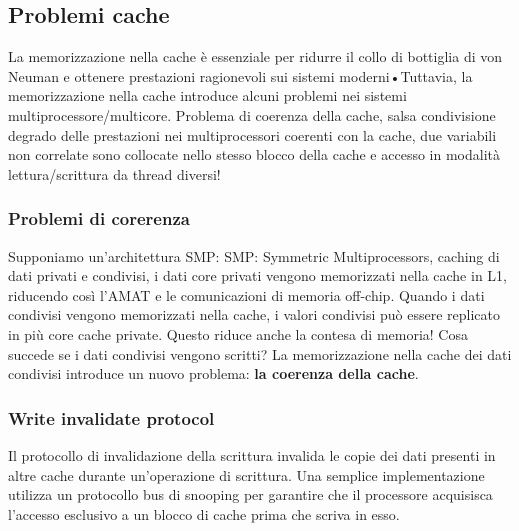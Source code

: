 \subsection{Problemi cache}
La memorizzazione nella cache è essenziale per ridurre il collo di bottiglia di von Neuman e ottenere prestazioni ragionevoli sui sistemi moderni•Tuttavia, la memorizzazione nella cache introduce alcuni problemi nei sistemi multiprocessore/multicore. 
Problema di coerenza della cache, salsa condivisione degrado delle prestazioni nei multiprocessori coerenti con la cache, due variabili non correlate sono collocate nello stesso blocco della cache e accesso in modalità lettura/scrittura da thread diversi!

\subsubsection{Problemi di corerenza}
Supponiamo un'architettura SMP: SMP: Symmetric Multiprocessors, caching di dati privati e condivisi, i dati core privati vengono memorizzati nella cache in L1, riducendo così l'AMAT e le comunicazioni di memoria off-chip. 
Quando i dati condivisi vengono memorizzati nella cache, i valori condivisi può essere replicato in più core cache private. Questo riduce anche la contesa di memoria! Cosa succede se i dati condivisi vengono scritti? 
La memorizzazione nella cache dei dati condivisi introduce un nuovo problema: \textbf{la coerenza della cache}.

\subsubsection{Write invalidate protocol}
Il protocollo di invalidazione della scrittura invalida le copie dei dati presenti in altre cache durante un'operazione di scrittura. 
Una semplice implementazione utilizza un protocollo bus di snooping per garantire che il processore acquisisca l'accesso esclusivo a un blocco di cache prima che scriva in esso.
